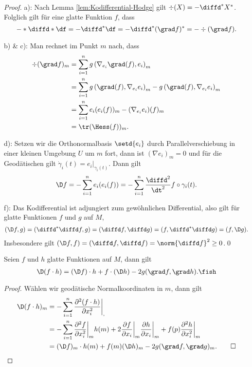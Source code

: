 \documentclass[%
	paper=a5,%
	fleqn,%
	DIV=18,%
	BCOR=0mm,
	fontsize=11pt,
	titlepage=false,%
	bibliography=totoc,
	DIV=18,%
	twoside=true,
	pdftitle=Riemannsche Geometrie,
	pdfauthor=Uwe Semmelmann,
	numbers=noendperiod]%
	{scrbook}
\begin{document}
\begin{proof}
a): Nach Lemma \ref{lem:Kodifferential-Hodge} gilt $\div(X) = -\diffd^*X^*$. Folglich gilt für eine glatte Funktion $f$, dass
\begin{align*}
-*\diffd * \df = -\diffd^* \df = -\diffd^* (\grad f)^* = -\div(\grad f).
\end{align*}

b) \& c): Man rechnet im Punkt $m$ nach, dass
\begin{align*}
\div(\grad f)_{m} &= \sum_{i=1}^n g\left(\nabla_{e_{i}}\grad(f),e_{i}\right)_{m}\\
&= \sum_{i=1}^n g\left(\grad(f),\nabla_{e_{i}}e_{i}\right)_{m} - g\left(\grad(f),\nabla_{e_{i}}e_{i}\right)_{m}\\
&= \sum_{i=1}^n e_{i}(e_{i}(f))_{m} - (\nabla_{e_{i}}e_{i})(f)_{m}\\
&= \tr(\Hess(f))_{m}.
\end{align*} 

d): Setzen wir die Orthonormalbasis $\setd{e_{i}}$ durch Parallelverschiebung in einer kleinen Umgebung $U$ um $m$ fort, dann ist $(\nabla e_{i})_{m} = 0$ und für die Geodätischen gilt $\dot{\gamma}_{i}(t) = e_{i}\big|_{\gamma_{i}(t)}$. Dann gilt
\begin{align*}
\D f = - \sum_{i=1}^n e_{i}(e_{i}(f)) =  - \sum_{i=1}^n \frac{\diffd^2}{\dt^2} f\circ\gamma_{i}(t).
\end{align*}

f): Das Kodifferential ist adjungiert zum gewöhnlichen Differential, also gilt für glatte Funktionen $f$ und $g$ auf $M$,
\begin{align*}
(\D f,g) = (\diffd^* \diffd f,g) = (\diffd f,\diffd g) = (f,\diffd^*\diffd g) = (f,\D g).
\end{align*}
Insbesondere gilt $(\D f,f) = (\diffd f,\diffd f) = \norm{\diffd f}^2 \ge 0$.\qed
\end{proof}

\begin{prop}[Produktregel]
Seien $f$ und $h$ glatte Funktionen auf $M$, dann gilt
\begin{align*}
\D(f\cdot h) = (\D f)\cdot h + f\cdot (\D h) - 2g(\grad f,\grad h).\fish
\end{align*}
\end{prop}
\begin{proof}
Wählen wir geodätische Normalkoordinaten in $m$, dann gilt
\begin{align*}
\D (f\cdot h)_{m} &= - \sum_{i=1}^n \frac{\partial^2 (f\cdot h)}{\partial x_{i}^2}\bigg|_{,}\\
& = - \sum_{i=1}^n 
\frac{\partial^2 f}{\partial x_{i}^2}\bigg|_{m} h(m)
+
2\frac{\partial f}{\partial x_{i}}\bigg|_{m}
\frac{\partial h}{\partial x_{i}}\bigg|_{m}
+
f(p)\frac{\partial^2 h}{\partial x_{i}^2}\bigg|_{m}\\
&= (\D f)_{m}\cdot h(m)
+ f(m)(\D h)_{m} - 2g(\grad f,\grad g)_{m}.\qed
\end{align*}
\end{proof}
\end{document}
